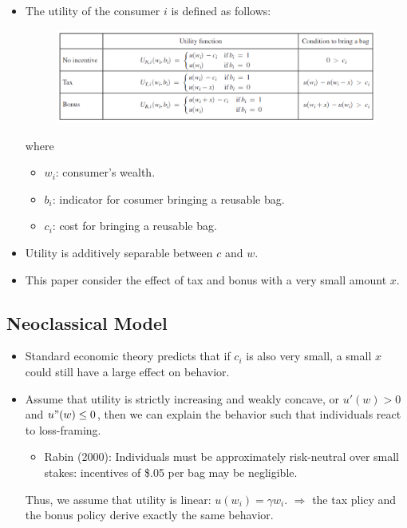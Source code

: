 \documentclass[../root]{subfiles}
\begin{document}
    \begin{itemize}
      \item The utility of the consumer $i$ is defined as follows:
      \begin{figure}[ht]
        \centering
        \includegraphics[scale = .8]{0807tanji/model}
      \end{figure}
      where
      \begin{itemize}
        \item $w_i$: consumer's wealth.
        \item $b_i$: indicator for cosumer bringing a reusable bag.
        \item $c_i$: cost for bringing a reusable bag.
      \end{itemize}
      \item Utility is additively separable between $c$ and $w$.
      \item This paper consider the effect of tax and bonus with a very small amount $x$.
    \end{itemize}

    \subsection{Neoclassical Model}

    \begin{itemize}
      \item Standard economic theory predicts that if $c_i$ is also very small, a small $x$ could still have a large effect on behavior.
      \item Assume that utility is strictly increasing and weakly concave, or $u'(w) > 0$ and $u"(w) \leq 0$, then we can explain the behavior such that individuals react to loss-framing.
      \begin{itemize}
        \item Rabin (2000): Individuals must be approximately risk-neutral over small stakes: incentives of \$.05 per bag may be negligible.
      \end{itemize}
      Thus, we assume that utility is linear: $u(w_i) = \gamma w_i$.
      $\Rightarrow$ the tax plicy and the bonus policy derive exactly the same behavior.
    \end{itemize}
\end{document}

